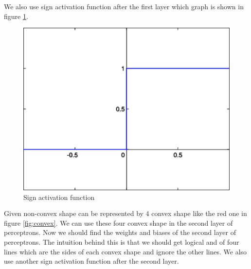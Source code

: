 \documentclass[en]{university}
\begin{document}
We also use sign activation function after the first layer which graph is shown in figure \ref{fig:sign}.

\begin{figure}[!htbp]
    \centering
    \includegraphics[width=1\textwidth]{assets/sign.png}    
    \caption{Sign activation function}
    \label{fig:sign}
\end{figure}

Given non-convex shape can be represented by 4 convex shape like the red one in figure \ref{fig:convex}. 
We can use these four convex shape in the second layer of perceptrons. Now we should find the weights and biases of the second layer of perceptrons. 
The intuition behind this is that we should get logical and of four lines which are the sides of each convex shape and ignore the other lines. 
We also use another sign activation function after the second layer.
\end{document}
